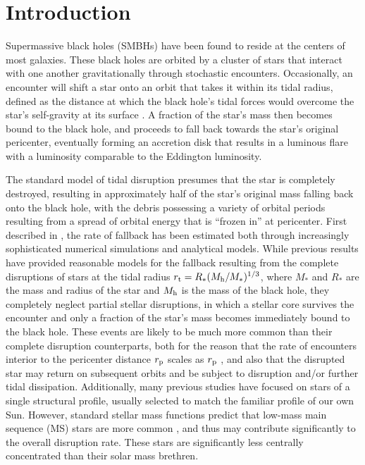 \documentclass[twocolumn]{emulateapj}
\newcommand{\ms}{M_{\ast}}
\newcommand{\rs}{R_{\ast}}
\newcommand{\rt}{r_{\rm t}}
\newcommand{\mh}{M_{\rm h}}
\begin{document}

\section{Introduction}

Supermassive black holes (SMBHs) have been found to reside at the centers of most galaxies. These black holes are orbited by a cluster of stars that interact with one another gravitationally through stochastic encounters. Occasionally, an encounter will shift a star onto an orbit that takes it within its tidal radius, defined as the distance at which the black hole's tidal forces would overcome the star's self-gravity at its surface \citep{Frank:1976tg}. A fraction of the star's mass then becomes bound to the black hole, and proceeds to fall back towards the star's original pericenter, eventually forming an accretion disk that results in a luminous flare with a luminosity comparable to the Eddington luminosity.

The standard model of tidal disruption presumes that the star is completely destroyed, resulting in approximately half of the star's original mass falling back onto the black hole, with the debris possessing a variety of orbital periods resulting from a spread of orbital energy that is ``frozen in'' at pericenter. First described in \cite{Rees:1988ei}, the rate of fallback has been estimated both through increasingly sophisticated numerical simulations and analytical models. While previous results have provided reasonable models for the fallback resulting from the complete disruptions of stars at the tidal radius $\rt = \rs (\mh/\ms)^{1/3}$, where $\ms$ and $\rs$ are the mass and radius of the star and $\mh$ is the mass of the black hole, they completely neglect partial stellar disruptions, in which a stellar core survives the encounter and only a fraction of the star's mass becomes immediately bound to the black hole. These events are likely to be much more common than their complete disruption counterparts, both for the reason that the rate of encounters interior to the pericenter distance $r_{\rm p}$ scales as $r_{\rm p}$ \citep{Hills:1988br}, and also that the disrupted star may return on subsequent orbits and be subject to disruption and/or further tidal dissipation. Additionally, many previous studies have focused on stars of a single structural profile, usually selected to match the familiar profile of our own Sun. However, standard stellar mass functions predict that low-mass main sequence (MS) stars are more common \citep[e.g.][]{Kroupa:1993tm}, and thus may contribute significantly to the overall disruption rate. These stars are significantly less centrally concentrated than their solar mass brethren.
\end{document}
